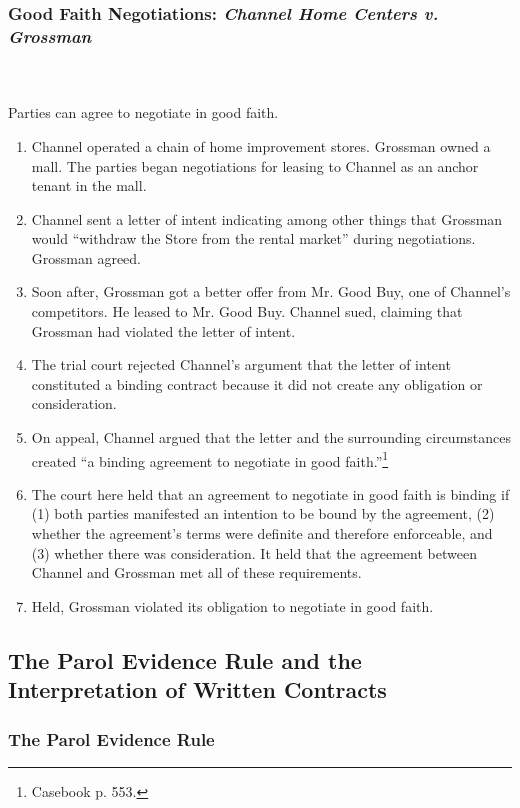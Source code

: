 \subsubsection{Good Faith Negotiations: \emph{Channel Home Centers v. 
Grossman}}
~\\\\
Parties can agree to negotiate in good faith.

\begin{enumerate}
    \item Channel operated a chain of home improvement stores. Grossman owned 
    a mall. The parties began negotiations for leasing to Channel as an anchor 
    tenant in the mall.
    \item Channel sent a letter of intent indicating among other things that 
    Grossman would ``withdraw the Store from the rental market'' during 
    negotiations. Grossman agreed.
    \item Soon after, Grossman got a better offer from Mr. Good Buy, one of 
    Channel's competitors. He leased to Mr. Good Buy. Channel sued, claiming 
    that Grossman had violated the letter of intent.
    \item The trial court rejected Channel's argument that the letter of 
    intent constituted a binding contract because it did not create any 
    obligation or consideration.
    \item On appeal, Channel argued that the letter and the surrounding 
    circumstances created ``a binding agreement to negotiate in good 
    faith.''\footnote{Casebook p. 553.}
    \item The court here held that an agreement to negotiate in good faith is 
    binding if (1) both parties manifested an intention to be bound by the 
    agreement, (2) whether the agreement's terms were definite and therefore 
    enforceable, and (3) whether there was consideration. It held that the 
    agreement between Channel and Grossman met all of these requirements.
    \item Held, Grossman violated its obligation to negotiate in good faith.
\end{enumerate}

\subsection{The Parol Evidence Rule and the Interpretation of Written 
Contracts}

\subsubsection{The Parol Evidence Rule}


